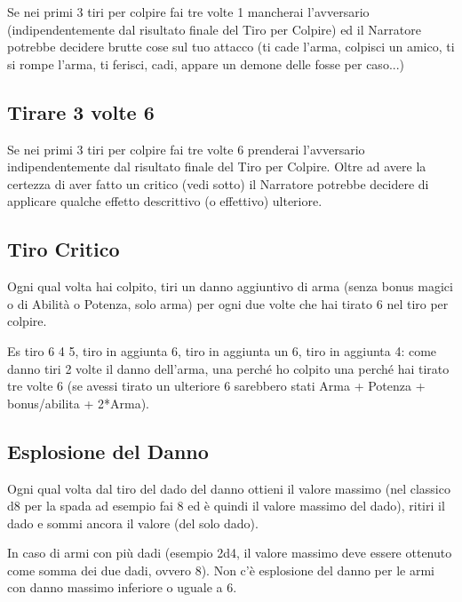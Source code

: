 \documentclass[a4paper,11pt,twoside,openany]{book}
\begin{document}
Se nei primi 3 tiri per colpire fai tre volte 1 mancherai l'avversario (indipendentemente dal risultato finale del Tiro per Colpire) ed il Narratore potrebbe decidere brutte cose sul tuo attacco (ti cade l'arma, colpisci un amico, ti si rompe l'arma, ti ferisci, cadi, appare un demone delle fosse per caso...)

\subsection{Tirare 3 volte 6}

Se nei primi 3 tiri per colpire fai tre volte 6 prenderai l'avversario indipendentemente dal risultato finale del Tiro per Colpire. Oltre ad avere la certezza di aver fatto un critico (vedi sotto) il Narratore potrebbe decidere di applicare qualche effetto descrittivo (o effettivo) ulteriore.

\subsection{Tiro Critico}

Ogni qual volta hai colpito, tiri un danno aggiuntivo di arma (senza bonus magici o di Abilità o Potenza, solo arma) per ogni due volte che hai tirato 6 nel tiro per colpire.

\medskip

\begin{tcolorbox}[title = Esempio Tiro Critico] 
Es tiro 6 4 5, tiro in aggiunta 6, tiro in aggiunta un 6, tiro in aggiunta 4: come danno tiri 2 volte il danno dell'arma, una perché ho colpito una perché hai tirato tre volte 6 (se avessi tirato un ulteriore 6 sarebbero stati Arma + Potenza + bonus/abilita + 2{*}Arma).
\end{tcolorbox}

\subsection{Esplosione del Danno}

Ogni qual volta dal tiro del dado del danno ottieni il valore massimo (nel classico d8 per la spada ad esempio fai 8 ed è quindi il valore massimo del dado), ritiri il dado e sommi ancora il valore (del solo dado).

In caso di armi con più dadi (esempio 2d4, il valore massimo deve essere ottenuto come somma dei due dadi, ovvero 8). Non c'è esplosione del danno per le armi con danno massimo inferiore o uguale a 6.
\end{document}
